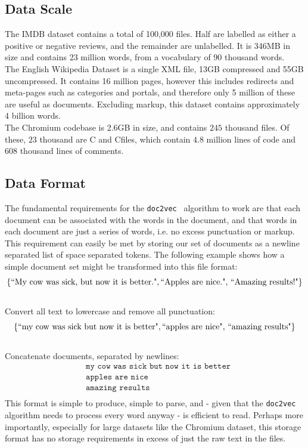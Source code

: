 \documentclass[11pt]{article}
\newcommand{\CPP}
{C\nolinebreak[4]\hspace{-.05em}\raisebox{.22ex}{\footnotesize\bf ++\ }}
\begin{document}
\subsection*{Data Scale}
The IMDB dataset contains a total of 100,000 files. Half are labelled as either a
positive or negative reviews, and the remainder are unlabelled. It is 346MB in size
and contains 23 million words, from a vocabulary of 90 thousand words.\\
The English Wikipedia Dataset is a single XML file, 13GB compressed and
55GB uncompressed. It contains 16 million pages, however this includes
redirects and meta-pages such as categories and portals, and therefore only
5 million of these are useful as documents. Excluding markup, this dataset contains
approximately 4 billion words.\\
The Chromium codebase is 2.6GB in size, and contains $245$ thousand files.
Of these, $23$ thousand are C and \CPP files, which contain $4.8$ million lines of
code and $608$ thousand lines of comments.

\subsection*{Data Format}
The fundamental requirements for the \texttt{doc2vec}~\cite{le2014distributed}
algorithm to work are that each document can be associated with the words in the
document, and that words in each document are just a series of words, i.e. no
excess punctuation or markup.\\
This requirement can easily be met by storing our set of documents as a newline
separated list of space separated tokens. The following example shows how a
simple document set might be transformed into this file format:\\
$$ \{\text{``My cow was sick, but now it is better."},
    \text{``Apples are nice.",
    \text{``Amazing results!"}}\} $$\\
Convert all text to lowercase and remove all punctuation:\\
$$ \{\text{``my cow was sick but now it is better"},
    \text{``apples are nice",
    \text{``amazing results"}}\} $$\\
Concatenate documents, separated by newlines:\\
\begin{align*}&\texttt{my cow was sick but now it is better}\\
&\texttt{apples are nice}\\
&\texttt{amazing results}\\\end{align*}
This format is simple to produce, simple to parse, and - given that the
\texttt{doc2vec} algorithm needs to process every word anyway - is efficient
to read. Perhaps more importantly, especially for large datasets like the
Chromium dataset, this storage format has no storage requirements in excess
of just the raw text in the files.
\end{document}
